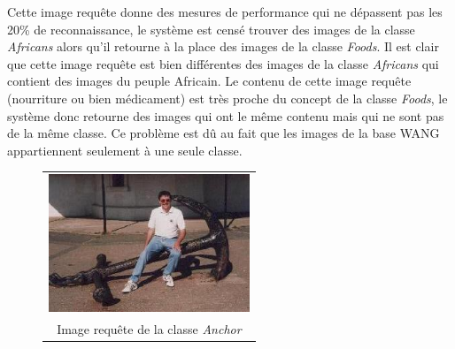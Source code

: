 	Cette image requête donne des mesures de performance qui ne dépassent pas les 20\% de reconnaissance, le système est censé trouver des images de la classe \textit{Africans} alors qu'il retourne à la place des images de la classe \textit{Foods}. Il est clair que cette image requête est bien différentes des images de la classe \textit{Africans} qui contient des images du peuple Africain. Le contenu de cette image requête (nourriture ou bien médicament) est très proche du concept de la classe \textit{Foods}, le système donc retourne des images qui ont le même contenu mais qui ne sont pas de la même classe. Ce problème est dû au fait que les images de la base WANG appartiennent seulement à une seule classe.

\begin{figure}[H]
\begin{tabular}{ccccc}\\


\multicolumn{5}{c}{\includegraphics[width=6cm]{Figures/anchor/0.jpg}}\\
\multicolumn{5}{c}{Image requête de la classe \textit{Anchor}}\\



\end{tabular}
\end{figure}
